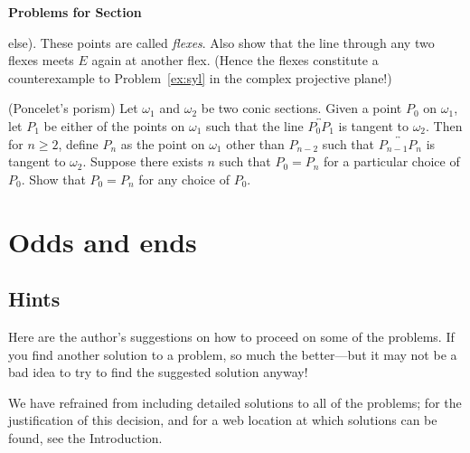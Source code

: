 \documentclass[12pt]{book}
\newcounter{exc}
\numberwithin{exc}{section}
\numberwithin{figure}{section}
\newenvironment{exer}{\vspace{0.1in}
\noindent \textbf{Problems for Section~\thesection} \vspace{0.1in}
\begin{list}{\arabic{exc}.}{\usecounter{exc}}}{\end{list}}
\numberwithin{equation}{theorem}
\def\ii{\item}
\def\line#1{\overleftrightarrow{#1}}
\begin{document}
\begin{exer}
else). These points are called \emph{flexes}.  
Also show that the line 
through any two flexes meets $E$ again at another flex. (Hence the 
flexes constitute a counterexample to Problem~\ref{ex:syl} in the 
complex projective plane!)
\ii (Poncelet's porism) \label{ex:projstein} 
Let $\omega_1$ and $\omega_2$ be two conic sections. Given a point $P_0$
on $\omega_1$, let $P_1$ be either of the points on $\omega_1$ such that
the line $\line{P_0P_1}$ is tangent to $\omega_2$. Then for $n \geq 2$,
define $P_n$ as the point on $\omega_1$ other than $P_{n-2}$ such that
$\line{P_{n-1}P_n}$ is tangent to $\omega_2$. Suppose there exists $n$ such
that $P_0=P_n$ for a particular choice of $P_0$. Show that
$P_0=P_n$ for any choice of $P_0$.
\end{exer}

\part{Odds and ends}
\label{part:solutions}

\setcounter{secnumdepth}{-1}
\chapter{Hints} \label{hints}

Here are the author's suggestions on how to proceed on some of the problems.
If you find another solution to a problem, so much the better---but it may not
be a bad idea to try to find the suggested solution anyway!

We have refrained from including detailed
solutions to all of the problems; for the justification of this decision,
and for a web location at which solutions can be found, see the Introduction.
\end{document}
